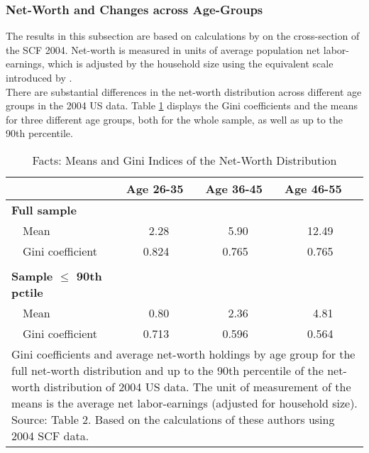 \documentclass[a4paper,12pt,legno]{article}
\begin{document}
\subsubsection{Net-Worth and Changes across Age-Groups}
The results in this subsection are based on calculations by \cite{hintermaier2011} on the cross-section of the SCF 2004. Net-worth is measured in units of average population net labor- earnings, which is adjusted by the household size using the equivalent scale introduced by \cite{fernandez2007consumption}. \\
There are substantial differences in the net-worth distribution across different age groups in the 2004 US data. 
Table \ref{facts_changes} displays the Gini coefficients and the means for three different age groups, both for the whole sample, as well as up to the 90th percentile.\\ 

\begin{table}[!htbp]
\centering
\caption{Facts: Means and Gini Indices of the Net-Worth Distribution}
\label{facts_changes}
\begin{tabular}{@{}llll@{}}
\toprule
                     & Age 26-35 & Age 36-45 & Age 46-55 \\ \midrule
\textbf{Full sample}          &           &           &           \\
\ \ Mean                 & \ \ \ \ 2.28      & \ \ \ \ 5.90      & \ \ \ \ 12.49     \\
\ \ Gini coefficient     & \ \ \ 0.824     & \ \ \ 0.765     & \ \ \ \ 0.765     \\ \\
\textbf{Sample $\leq$ 90th pctile} &           &           &           \\
\ \ Mean                 & \ \ \ \ 0.80      & \ \ \ \ 2.36      & \ \ \ \ \ 4.81      \\
\ \ Gini coefficient     & \ \ \ 0.713     & \ \ \ 0.596     & \ \ \ \ 0.564     \\ \bottomrule
\multicolumn{4}{l}{%
  \begin{minipage}{11.5cm}%
    \small Gini coefficients and average net-worth holdings by age group for the full net-worth distribution and up to the 90th percentile of the net-worth distribution of 2004 US data. The unit of measurement of the means is the average net labor-earnings (adjusted for household size). Source: \cite{hintermaier2011} Table 2. Based on the calculations of these authors using 2004 SCF data. 
  \end{minipage}%
}\\
\end{tabular}
\end{table}
\end{document}
